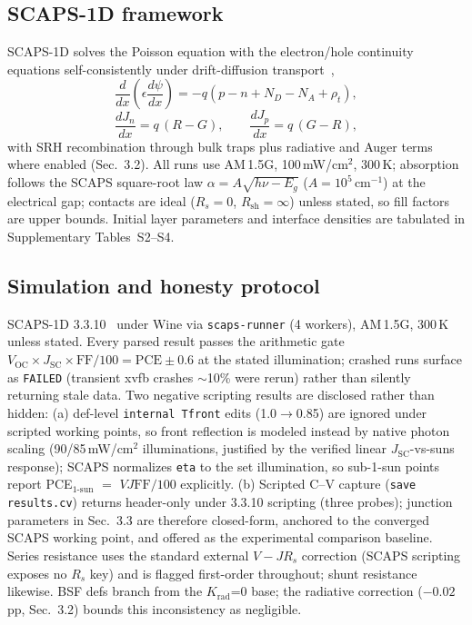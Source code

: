 \documentclass[review]{elsarticle}
\begin{document}
\subsection{SCAPS-1D framework}
SCAPS-1D solves the Poisson equation with the electron/hole continuity equations self-consistently under drift-diffusion transport~\cite{r19,r20},
\begin{equation}
\frac{d}{dx}\left(\epsilon\frac{d\psi}{dx}\right) = -q\left(p-n+N_{D}-N_{A}+\rho_{t}\right),
\end{equation}
\begin{equation}
\frac{dJ_{n}}{dx} = q\,(R-G), \qquad \frac{dJ_{p}}{dx} = q\,(G-R),
\end{equation}
with SRH recombination through bulk traps plus radiative and Auger terms where enabled (Sec.~3.2). All runs use AM\,1.5G, 100\,mW/cm$^{2}$, 300\,K; absorption follows the SCAPS square-root law $\alpha=A\sqrt{h\nu-E_{g}}$ ($A=10^{5}$\,cm$^{-1}$) at the electrical gap; contacts are ideal ($R_{s}=0$, $R_{\mathrm{sh}}=\infty$) unless stated, so fill factors are upper bounds. Initial layer parameters and interface densities are tabulated in Supplementary Tables~S2--S4.

\subsection{Simulation and honesty protocol}
SCAPS-1D 3.3.10~\cite{r19} under Wine via \texttt{scaps-runner} (4 workers), AM\,1.5G, 300\,K unless stated. Every parsed result passes the arithmetic gate $V_{\mathrm{OC}}\!\times\! J_{\mathrm{SC}}\!\times\! \mathrm{FF}/100 = \mathrm{PCE} \pm 0.6$ at the stated illumination; crashed runs surface as \texttt{FAILED} (transient xvfb crashes $\sim$10\% were rerun) rather than silently returning stale data. Two negative scripting results are disclosed rather than hidden: (a) def-level \texttt{internal Tfront} edits (1.0$\rightarrow$0.85) are ignored under scripted working points, so front reflection is modeled instead by native photon scaling (90/85\,mW/cm$^{2}$ illuminations, justified by the verified linear $J_{\mathrm{SC}}$-vs-suns response); SCAPS normalizes \texttt{eta} to the set illumination, so sub-1-sun points report PCE$_{1\text{-sun}}$ $=$ $VJ\mathrm{FF}/100$ explicitly. (b) Scripted C--V capture (\texttt{save results.cv}) returns header-only under 3.3.10 scripting (three probes); junction parameters in Sec.~3.3 are therefore closed-form, anchored to the converged SCAPS working point, and offered as the experimental comparison baseline. Series resistance uses the standard external $V-JR_{s}$ correction (SCAPS scripting exposes no $R_{s}$ key) and is flagged first-order throughout; shunt resistance likewise. BSF defs branch from the $K_{\mathrm{rad}}$=0 base; the radiative correction ($-0.02$\,pp, Sec.~3.2) bounds this inconsistency as negligible.
\end{document}
